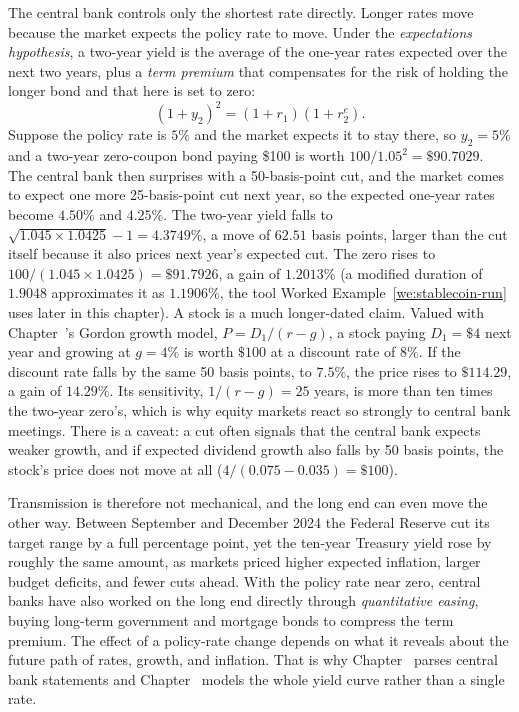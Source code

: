 \documentclass[../ai_in_finance]{subfiles}
\begin{document}
The central bank controls only the shortest rate directly. Longer rates move because the market expects the policy rate to move. Under the \emph{expectations hypothesis}, a two-year yield is the average of the one-year rates expected over the next two years, plus a \emph{term premium} that compensates for the risk of holding the longer bond and that here is set to zero:
\begin{equation*}
(1+y_2)^2 = (1+r_1)(1+r_2^{e}).
\end{equation*}
Suppose the policy rate is $5\%$ and the market expects it to stay there, so $y_2 = 5\%$ and a two-year zero-coupon bond paying \$100 is worth $100/1.05^2 = \$90.7029$. The central bank then surprises with a 50-basis-point cut, and the market comes to expect one more 25-basis-point cut next year, so the expected one-year rates become $4.50\%$ and $4.25\%$. The two-year yield falls to $\sqrt{1.045 \times 1.0425} - 1 = 4.3749\%$, a move of $62.51$ basis points, larger than the cut itself because it also prices next year's expected cut. The zero rises to $100/(1.045 \times 1.0425) = \$91.7926$, a gain of $1.2013\%$ (a modified duration of $1.9048$ approximates it as $1.1906\%$, the tool Worked Example~\ref{we:stablecoin-run} uses later in this chapter). A stock is a much longer-dated claim. Valued with Chapter~'s Gordon growth model, $P = D_1/(r-g)$, a stock paying $D_1 = \$4$ next year and growing at $g = 4\%$ is worth $\$100$ at a discount rate of $8\%$. If the discount rate falls by the same 50 basis points, to $7.5\%$, the price rises to $\$114.29$, a gain of $14.29\%$. Its sensitivity, $1/(r-g) = 25$ years, is more than ten times the two-year zero's, which is why equity markets react so strongly to central bank meetings. There is a caveat: a cut often signals that the central bank expects weaker growth, and if expected dividend growth also falls by 50 basis points, the stock's price does not move at all ($4/(0.075 - 0.035) = \$100$).

Transmission is therefore not mechanical, and the long end can even move the other way. Between September and December 2024 the Federal Reserve cut its target range by a full percentage point, yet the ten-year Treasury yield rose by roughly the same amount, as markets priced higher expected inflation, larger budget deficits, and fewer cuts ahead. With the policy rate near zero, central banks have also worked on the long end directly through \emph{quantitative easing}, buying long-term government and mortgage bonds to compress the term premium. The effect of a policy-rate change depends on what it reveals about the future path of rates, growth, and inflation. That is why Chapter~ parses central bank statements and Chapter~ models the whole yield curve rather than a single rate.
\end{document}
